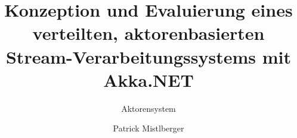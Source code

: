 \documentclass[type=master,theme=default,language=german,titlelanguage=german,smartquotes,apa]{hgbthesis}
\begin{document}


\title{Konzeption und Evaluierung eines verteilten, aktorenbasierten Stream-Verarbeitungssystems mit
Akka.NET
}
\subtitle{Aktorensystem}
\author{Patrick Mistlberger}





\frontmatter                                       %

\maketitle
\tableofcontents

		


\mainmatter                             %








\appendix                                                               %
\end{document}
